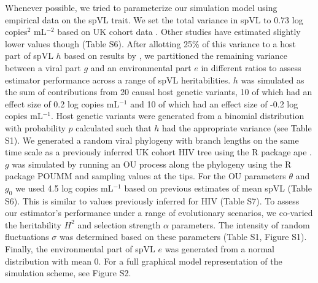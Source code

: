 \documentclass[11pt]{article}
\begin{document}
\begin{linenumbers}
Whenever possible, we tried to parameterize our simulation model using empirical data on the spVL trait. We set the total variance in spVL to 0.73 log copies$^2$ mL$^{-2}$ based on UK cohort data \citep{Mitov2018}. Other studies have estimated slightly lower values though (Table S6). After allotting 25\% of this variance to a host part of spVL $h$ based on results by \citet{McLaren2015}, we partitioned the remaining variance between a viral part $g$ and an environmental part $e$ in different ratios to assess estimator performance across a range of spVL heritabilities. $h$ was simulated as the sum of contributions from 20 causal host genetic variants, 10 of which had an effect size of 0.2 log copies mL$^{-1}$ and 10 of which had an effect size of -0.2 log copies mL$^{-1}$. Host genetic variants were generated from a binomial distribution with probability $p$ calculated such that $h$ had the appropriate variance (see Table S1). We generated a random viral phylogeny with branch lengths on the same time scale as a previously inferred UK cohort HIV tree \citep{Hodcroft2014} using the R package ape \citep{Paradis2018}. $g$ was simulated by running an OU process along the phylogeny using the R package POUMM \citep{Mitov2017a-POUMM} and sampling values at the tips. For the OU parameters $\theta$ and $g_{0}$ we used 4.5 log copies mL$^{-1}$ based on previous estimates of mean spVL (Table S6). This is similar to values previously inferred for HIV (Table S7). To assess our estimator's performance under a range of evolutionary scenarios, we co-varied the heritability $H^2$ and selection strength $\alpha$ parameters. The intensity of random fluctuations $\sigma$ was determined based on these parameters (Table S1, Figure S1). Finally, the environmental part of spVL $e$ was generated from a normal distribution with mean 0.  For a full graphical model representation of the simulation scheme, see Figure S2. 


\end{linenumbers}
\end{document}
